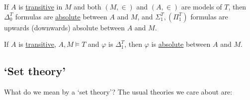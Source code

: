 \documentclass{article}
\let\models\vDash
\begin{document}
\begin{cor}
  If $A$ is \hyperlink{def:transitive}{transitive} in $M$ and both $(M,\in)$ and $(A,\in)$ are models of $T$, then \hyperlink{def:delta0t}{$\Delta_0^T$} formulas are \hyperlink{def:abso}{absolute} between $A$ and $M$, and $\Sigma_1^T, (\Pi_1^T)$ formulas are upwards (downwards) absolute between $A$ and $M$.
\end{cor}
\begin{cor}
  If $A$ is \hyperlink{def:trans}{transitive}, $A,M \models T$ and $\varphi$ is \hyperlink{def:delta1t}{$\Delta_1^T$}, then $\varphi$ is \hyperlink{def:abso}{absolute} between $A$ and $M$.
\end{cor}
\subsection{`Set theory'}
What do we mean by a `set theory'? The usual theories we care about are:
\end{document}
